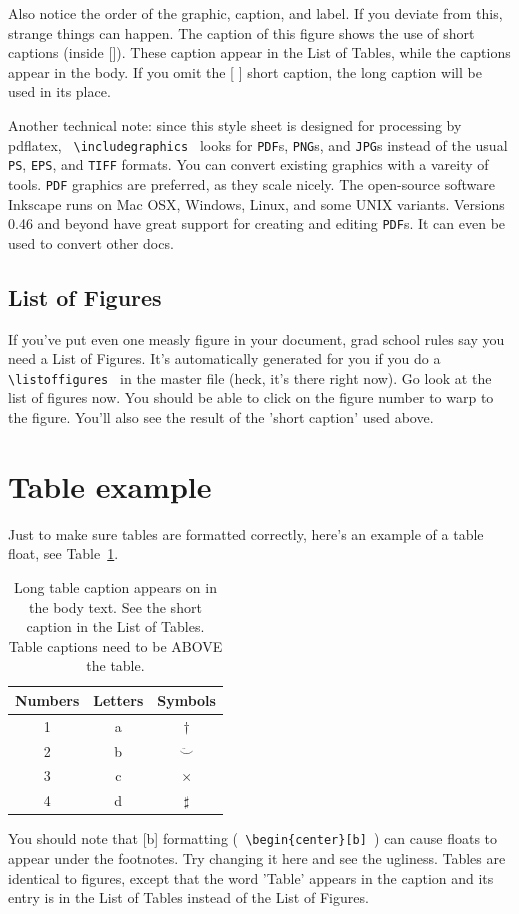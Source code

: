 Also notice the order of the graphic, caption, and label.  If you deviate
from this, strange things can happen.  The caption of this figure shows the
use of short captions (inside []).  These caption appear in the List of
Tables, while the { } captions appear in the body.  If you omit the [ ]
short caption, the long caption will be used in its place.

Another technical note: since this style sheet is designed for processing
by pdflatex, {\verb| \includegraphics |} looks for \texttt{PDF}s,
\texttt{PNG}s, and \texttt{JPG}s instead of the usual \texttt{PS},
\texttt{EPS}, and \texttt{TIFF} formats.  You can convert existing graphics
with a vareity of tools.  \texttt{PDF} graphics are preferred, as they
scale nicely.  The open-source software Inkscape runs on Mac OSX, Windows,
Linux, and some \textsc{UNIX} variants.  Versions 0.46 and beyond have great
support for creating and editing \texttt{PDF}s.  It can even be used to
convert other docs.

\subsection{List of Figures}
If you've put even one measly figure in your document, grad school rules say
you need a List of Figures.  It's automatically generated for you if you do
a {\verb| \listoffigures |} in the master file (heck, it's there right now).
Go look at the list of figures now.  You should be able to click on the
figure number to warp to the figure.  You'll also see the result of the
'short caption' used above.


\section{Table example}

Just to make sure tables are formatted correctly, 
here's an example of a table float, see Table~\ref{tab:example}.
\begin{table}[t]
\caption[Short table caption appears only in List of Tables.]{Long table
	caption appears on in the body text.  See the short caption in the List
	of Tables.  Table captions need to be ABOVE the table.}
	\label{tab:example}
	\begin{center}
	\begin{tabular}{c|c|c}
			\hline
			Numbers & Letters & Symbols \\ \hline
			1 & a & $\dagger$ \\
			2 & b & $\ddot \smile$ \\
			3 & c & $\times$ \\
			4 & d & $\sharp$
		\end{tabular}
	\end{center}
\end{table}
You should note that [b] formatting 
({\verb| \begin{center}[b] |})
can cause floats to appear under the
footnotes.  Try changing it here and see the ugliness.  Tables are identical
to figures, except that the word 'Table' appears in the caption and its
entry is in the List of Tables instead of the List of Figures.

